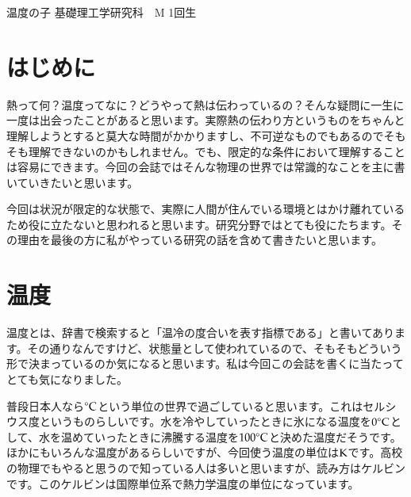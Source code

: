 \documentclass[10pt,b5paper,papersize,dvipdfmx]{jsbook}
\begin{document}


\kaishititle%
  {温度の子}%
  {基礎理工学研究科　M 1回生}%
  {}%


\section*{はじめに}
熱って何？温度ってなに？どうやって熱は伝わっているの？そんな疑問に一生に一度は出会ったことがあると思います。実際熱の伝わり方というものをちゃんと理解しようとすると莫大な時間がかかりますし、不可逆なものでもあるのでそもそも理解できないのかもしれません。でも、限定的な条件において理解することは容易にできます。今回の会誌ではそんな物理の世界では常識的なことを主に書いていきたいと思います。\par
今回は状況が限定的な状態で、実際に人間が住んでいる環境とはかけ離れているため役に立たないと思われると思います。研究分野ではとても役にたちます。その理由を最後の方に私がやっている研究の話を含めて書きたいと思います。


%
\section{温度}
温度とは、辞書で検索すると「温冷の度合いを表す指標である」と書いてあります。その通りなんですけど、状態量として使われているので、そもそもどういう形で決まっているのか気になると思います。私は今回この会誌を書くに当たってとても気になりました。\par 
普段日本人なら$^\circ \rm{C}$という単位の世界で過ごしていると思います。これはセルシウス度というものらしいです。水を冷やしていったときに氷になる温度を$0 ^\circ \rm{C}$として、水を温めていったときに沸騰する温度を$100 ^\circ \rm{C}$と決めた温度だそうです。ほかにもいろんな温度があるらしいですが、今回使う温度の単位は$\rm{K}$です。高校の物理でもやると思うので知っている人は多いと思いますが、読み方はケルビンです。このケルビンは国際単位系で熱力学温度の単位になっています。\par
\end{document}
